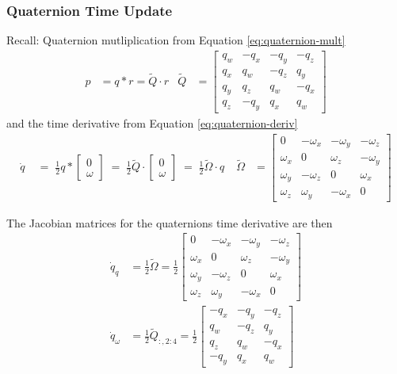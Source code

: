 \subsubsection{Quaternion Time Update}
Recall: Quaternion mutliplication from Equation \ref{eq:quaternion-mult}
\begin{align}
    p &= q * r = \tilde Q \cdot r &
    \tilde Q &= \begin{bmatrix}
        q_w & -q_x & -q_y & -q_z \\
        q_x & q_w & -q_z & q_y \\
        q_y & q_z & q_w & -q_x \\
        q_z & -q_y & q_x & q_w
    \end{bmatrix} 
\end{align}
and the time derivative from Equation \ref{eq:quaternion-deriv}
\begin{align}
    \dot q \;
    &= \; \frac{1}{2} q * \begin{bmatrix}
        0 \\ \omega
    \end{bmatrix} \;
    = \; \frac{1}{2} \tilde Q \cdot \begin{bmatrix}
        0 \\ \omega
    \end{bmatrix} \;
    = \; \frac{1}{2} \tilde \Omega \cdot q \;
    & 
    \tilde \Omega &= \begin{bmatrix}
        0 & -\omega_x & -\omega_y & -\omega_z \\
        \omega_x & 0 & \omega_z & -\omega_y \\
        \omega_y & -\omega_z & 0 & \omega_x \\
        \omega_z & \omega_y & -\omega_x & 0
    \end{bmatrix}    
\end{align}

The Jacobian matrices for the quaternions time derivative are then
\begin{align}
    \dot q_q &= \frac{1}{2} \tilde \Omega = \frac{1}{2} \begin{bmatrix}
        0 & -\omega_x & -\omega_y & -\omega_z \\
        \omega_x & 0 & \omega_z & -\omega_y \\
        \omega_y & -\omega_z & 0 & \omega_x \\
        \omega_z & \omega_y & -\omega_x & 0
    \end{bmatrix}    
    \\
    \dot q_\omega &= \frac{1}{2} \tilde Q_{:, 2:4} = \frac{1}{2} \begin{bmatrix}
        -q_x & -q_y & -q_z \\
        q_w & -q_z & q_y \\
        q_z & q_w & -q_x \\
        -q_y & q_x & q_w
    \end{bmatrix} 
\end{align}


